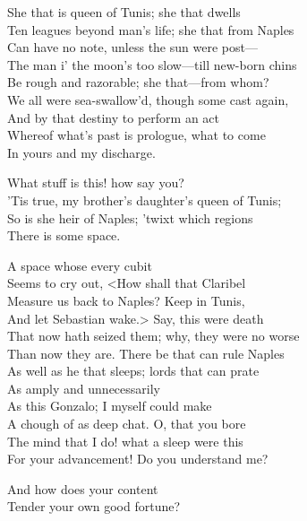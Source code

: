 \begin{verse_speech}[Antonio] 
She that is queen of Tunis; she that dwells\\
Ten leagues beyond man's life; she that from Naples\\
Can have no note, unless the sun were post—\\
The man i' the moon's too slow—till new-born chins\\
Be rough and razorable; she that—from whom?\\
We all were sea-swallow'd, though some cast again,\\
And by that destiny to perform an act\\
Whereof what's past is prologue, what to come\\
In yours and my discharge.
\end{verse_speech}

\begin{verse_speech}[Sebastian] 
What stuff is this! how say you?\\
'Tis true, my brother's daughter's queen of Tunis;\\
So is she heir of Naples; 'twixt which regions\\
There is some space.
\end{verse_speech}

\begin{verse_speech}[Antonio] 
A space whose every cubit\\
Seems to cry out, <How shall that Claribel\\
Measure us back to Naples? Keep in Tunis,\\
And let Sebastian wake.> Say, this were death\\
That now hath seized them; why, they were no worse\\
Than now they are. There be that can rule Naples\\
As well as he that sleeps; lords that can prate\\
As amply and unnecessarily\\
As this Gonzalo; I myself could make\\
A chough of as deep chat. O, that you bore\\
The mind that I do! what a sleep were this\\
For your advancement! Do you understand me?
\end{verse_speech}

\begin{verse_speech}[Antonio] 
And how does your content\\
Tender your own good fortune?
\end{verse_speech}

